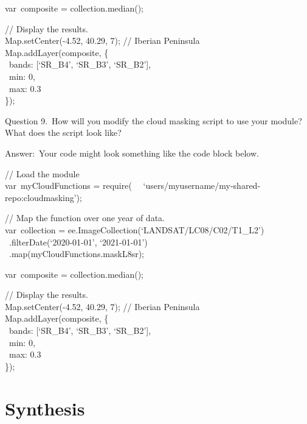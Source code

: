 \documentclass[
  letterpaper,
  DIV=11,
  numbers=noendperiod]{scrreprt}
\begin{document}
var~composite = collection.median();

// Display the results.\\
Map.setCenter(-4.52, 40.29, 7); // Iberian Peninsula\\
Map.addLayer(composite, \{\\
\hspace*{0.333em} ~bands: {[}`SR\_B4', `SR\_B3', `SR\_B2'{]},\\
\hspace*{0.333em} ~min: 0,\\
\hspace*{0.333em} ~max: 0.3\\
\});

Question 9.~How will you modify the cloud masking script to use your
module? What does the script look like?

Answer:~Your code might look something like the code block below.

// Load the module\\
var~myCloudFunctions = require(~
~`users/myusername/my-shared-repo:cloudmasking');

// Map the function over one year of data.\\
var~collection = ee.ImageCollection(`LANDSAT/LC08/C02/T1\_L2')\\
\hspace*{0.333em} ~.filterDate(`2020-01-01', `2021-01-01')\\
\hspace*{0.333em} ~.map(myCloudFunctions.maskL8sr);

var~composite = collection.median();

// Display the results.\\
Map.setCenter(-4.52, 40.29, 7); // Iberian Peninsula\\
Map.addLayer(composite, \{\\
\hspace*{0.333em} ~bands: {[}`SR\_B4', `SR\_B3', `SR\_B2'{]},\\
\hspace*{0.333em} ~min: 0,\\
\hspace*{0.333em} ~max: 0.3\\
\});

\hypertarget{synthesis-18}{%
\section*{Synthesis}\label{synthesis-18}}
\end{document}
